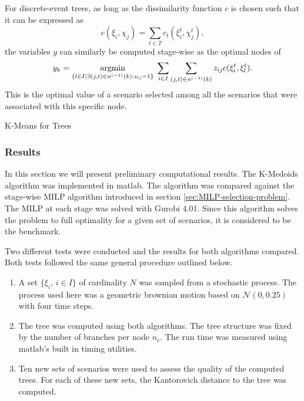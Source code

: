 For discrete-event trees, as long as the dissimilarity function $c$ is chosen such that it can be expressed as
\begin{equation}
  \label{eq:16}
  c(\xi_i, \chi_j) = \sum_{t\in T}c_t(\xi_i^t,\chi_j^t),
\end{equation}
the variables $y$ can similarly be computed stage-wise as the optimal nodes of
\begin{equation}
  \label{eq:17}
  y_k = \underset{\{l\in I|\exists (j,t)\in n^{(-1)}(k):z_{lj}=1\} }{\operatorname{argmin}}\; \sum_{i\in I}\sum_{(j,t)\in n^{(-1)}(k)}z_{ij}c(\xi_i^t, \xi_l^t).
\end{equation}
This is the optimal value of a scenario selected among all the scenarios that were associated with this specific node.
\begin{algorithm}
  \caption{K-Means for Trees}
  \BlankLine
\end{algorithm}
\subsubsection{Results}
\label{sec:kmeans-results}
In this section we will present preliminary computational results.
The K-Medoids  algorithm was implemented in {\sc matlab}.
The algorithm was compared against the stage-wise MILP algorithm introduced in section \ref{sec:MILP-selection-problem}.
The MILP at each stage was solved with Gurobi 4.01.
Since this algorithm solves the problem to full optimality for a given set of scenarios, it is considered to be the benchmark.

Two different tests were conducted and the results for both algorithms compared.
Both tests followed the same general procedure outlined below.
\begin{enumerate}
\item A set $\{\xi_i,\, i\in I\}$ of cardinality $N$ was sampled from a stochastic process.
  The process used here was a geometric brownian motion based on $\mathcal{N}(0,0.25)$ with four time steps.
\item The tree was computed using both algorithms.
The tree structure was fixed by the number of branches per node $n_c$.
The run time was measured using {\sc matlab}'s built in timing utilities.
\item Ten new sets of scenarios were used to assess the quality of the computed trees.
  For each of these new sets, the Kantorovich distance to the tree was computed.
\end{enumerate}

